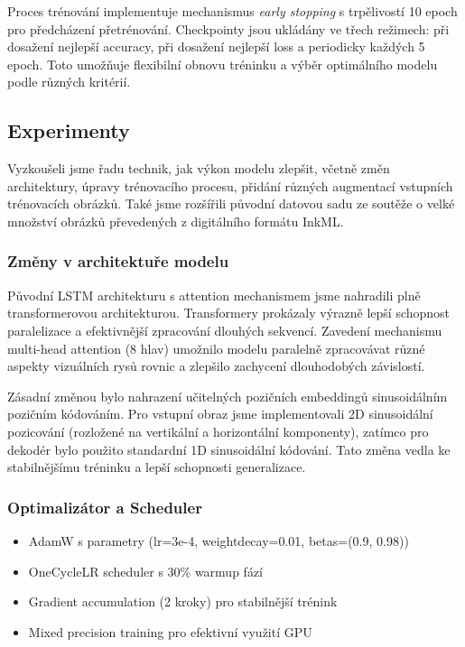 Proces trénování implementuje mechanismus \textit{early stopping} s trpělivostí 10 epoch pro předcházení přetrénování. Checkpointy jsou ukládány ve třech režimech: při dosažení nejlepší accuracy, při dosažení nejlepší loss a periodicky každých 5 epoch. Toto umožňuje flexibilní obnovu tréninku a výběr optimálního modelu podle různých kritérií.


\subsection{Experimenty}

Vyzkoušeli jsme řadu technik, jak výkon modelu zlepšit, včetně změn architektury, úpravy trénovacího procesu, přidání různých augmentací vstupních trénovacích obrázků. Také jsme rozšířili původní datovou sadu ze soutěže o velké množství obrázků převedených z digitálního formátu InkML. 

\subsubsection{Změny v architektuře modelu}

Původní LSTM architekturu s attention mechanismem jsme nahradili plně transformerovou architekturou. Transformery prokázaly výrazně lepší schopnost paralelizace a efektivnější zpracování dlouhých sekvencí. Zavedení mechanismu multi-head attention (8 hlav) umožnilo modelu paralelně zpracovávat různé aspekty vizuálních rysů rovnic a zlepšilo zachycení dlouhodobých závislostí.

Zásadní změnou bylo nahrazení učitelných pozičních embeddingů sinusoidálním pozičním kódováním. Pro vstupní obraz jsme implementovali 2D sinusoidální pozicování (rozložené na vertikální a horizontální komponenty), zatímco pro dekodér bylo použito standardní 1D sinusoidální kódování. Tato změna vedla ke stabilnějšímu tréninku a lepší schopnosti generalizace.

\subsubsection{Optimalizátor a Scheduler}
\begin{itemize}
    \item AdamW s parametry (lr=3e-4, weight\textunderscore decay=0.01, betas=(0.9, 0.98))
    \item OneCycleLR scheduler s 30\% warmup fází
    \item Gradient accumulation (2 kroky) pro stabilnější trénink
    \item Mixed precision training pro efektivní využití GPU
\end{itemize}

